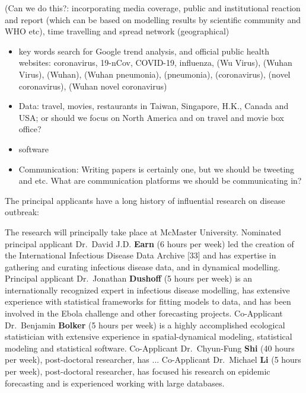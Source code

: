 (Can we do this?: incorporating media coverage, public and institutional reaction and report (which can be based on modelling results by scientific community and WHO etc), time travelling and spread network (geographical)

\begin{itemize}
\item{key words search for Google trend analysis, and official public health websites: coronavirus, 19-nCov, COVID-19, influenza, (Wu Virus), (Wuhan Virus), (Wuhan), (Wuhan pneumonia), (pneumonia), (coronavirus), (novel coronavirus), (Wuhan novel coronavirus)}
\end{itemize}

\begin{itemize}
\item{Data: travel, movies, restaurants in Taiwan, Singapore, H.K., Canada and USA; or should we focus on North America and on travel and movie box office?}
\end{itemize}


\begin{itemize}
\item{software}
\item{Communication: Writing papers is certainly one, but we should be tweeting and etc. What are communication platforms we should be communicating in?}
\end{itemize}



The principal applicants have a long history of influential research on disease outbreak: 

The research will principally take place at McMaster University. 
Nominated principal applicant Dr.\ David J.D. \textbf{Earn} (6 hours per week) led the creation of the International Infectious Disease Data Archive [33] and has expertise in gathering and curating infectious disease data, and in dynamical modelling.
Principal applicant Dr.\ Jonathan \textbf{Dushoff} (5 hours per week) is an internationally recognized expert in infectious disease modelling, has extensive experience with statistical frameworks for fitting models to data, and has been involved in the Ebola challenge and other forecasting projects. 
Co-Applicant Dr.\ Benjamin \textbf{Bolker} (5 hours per week) is a highly accomplished ecological statistician with extensive experience in spatial-dynamical modeling, statistical modeling and statistical software.
Co-Applicant Dr.\ Chyun-Fung \textbf{Shi} (40 hours per week), post-doctoral researcher, has ...
Co-Applicant Dr.\ Michael \textbf{Li} (5 hours per week), post-doctoral researcher, has focused his research on epidemic forecasting and is experienced working with large databases. 

